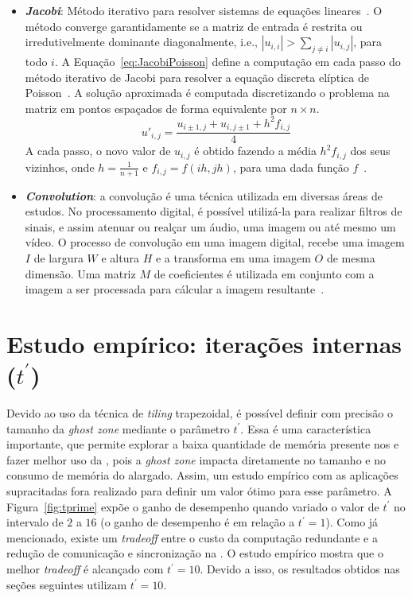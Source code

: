 \begin{itemize}
  \item \textbf{\textit{Jacobi}}: Método iterativo para resolver sistemas de equações lineares~\cite{demmel97}.
  O método converge garantidamente se a matriz de entrada é restrita ou irredutivelmente dominante diagonalmente, i.e., $|u_{i,i}| > \sum_{j\neq i}{|u_{i,j}|}$, para todo $i$.
  A Equação~\ref{eq:JacobiPoisson} define a computação em cada passo do método iterativo de Jacobi para resolver a equação discreta elíptica de Poisson~\cite{demmel97}. A solução aproximada é computada discretizando o problema na matriz em pontos espaçados de forma equivalente por $n\times n$.\\
   \begin{equation}
   u'_{i,j} = \frac{u_{i\pm1,j} + u_{i,j\pm1} + h^2f_{i,j}}{4}
   \label{eq:JacobiPoisson}
   \end{equation}
   A cada passo, o novo valor de $u_{i,j}$ é obtido fazendo a média $h^2f_{i,j}$ dos seus vizinhos, onde $h = \frac{1}{n+1}$ e $f_{i,j} = f(ih,jh)$,
   para uma dada função $f$~\cite{Podesta:TCC}.

  \item \textbf{\textit{Convolution}}: a convolução é uma técnica utilizada em diversas áreas de estudos. No processamento digital, é possível utilizá-la para realizar filtros de sinais, e assim atenuar ou realçar um áudio, uma imagem ou até mesmo um vídeo. O processo de convolução em uma imagem digital, recebe uma imagem $\mathit{I}$ de largura $\mathit{W}$ e altura $\mathit{H}$ e a transforma em uma imagem $\mathit{O}$ de mesma dimensão. Uma matriz $\mathit{M}$ de coeficientes é utilizada em conjunto com a imagem a ser processada para cálcular a imagem resultante~\cite{CPE:CPE3479}.
\end{itemize}

\section{Estudo empírico: iterações internas (\texorpdfstring{$t^\prime$}{t'})}
\label{sec:tam_tile_alargado}

Devido ao uso da técnica de \textit{tiling} trapezoidal, é possível definir com precisão o tamanho da \textit{ghost zone} mediante o parâmetro $t^\prime$. Essa é uma característica importante, que permite explorar a baixa quantidade de memória presente nos \clusters e fazer melhor uso da \noc, pois a \textit{ghost zone} impacta diretamente no tamanho e no consumo de memória do \tile alargado. Assim, um estudo empírico com as aplicações supracitadas fora realizado para definir um valor ótimo para esse parâmetro. A Figura~\ref{fig:tprime} expõe o ganho de desempenho quando variado o valor de $t^\prime$ no intervalo de $2$ a $16$ (o ganho de desempenho é em relação a $t^\prime=1$). Como já mencionado, existe um \textit{tradeoff} entre o custo da computação redundante e a redução de comunicação e sincronização na \noc. O estudo empírico mostra que o melhor \textit{tradeoff} é alcançado com $t^\prime=10$. Devido a isso, os resultados obtidos nas seções seguintes utilizam $t^\prime=10$.

